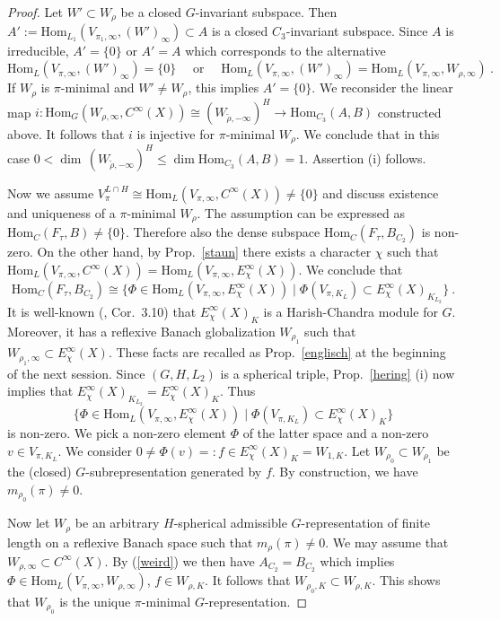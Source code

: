 \documentclass[10]{amsart}
\theoremstyle{remark}
\theoremstyle{definition}
\numberwithin{equation}{section}
\newcommand{\Hom}{\mathrm{Hom}}
\begin{document}
{\begin{proof}
Let $W'\subset W_\rho$ be a closed $G$-invariant subspace. Then $A':=\Hom_{L_1}(V_{\pi_1,\infty},(W')_{\infty})\subset A$ is a closed $C_3$-invariant subspace. Since $A$ is irreducible, 
$A'=\{0\}$ or $A'=A$ 
which corresponds to the alternative 
$$\Hom_{L}(V_{\pi,\infty},(W')_{\infty})=\{0\}\quad\mbox{ or }\quad\Hom_{L}(V_{\pi,\infty},(W')_{\infty})=\Hom_{L}(V_{\pi,\infty},W_{\rho,\infty})\ .$$
If $W_\rho$ is $\pi$-minimal and $W'\ne W_\rho$, this implies $A'=\{0\}$. 
We reconsider the linear map $i: \Hom_G(W_{\rho,\infty}, C^\infty(X))\cong (W_{\tilde\rho,-\infty})^H \rightarrow \Hom_{C_3}(A,B)$ constructed above.
It follows that $i$  is injective for $\pi$-minimal $W_\rho$.
We conclude that in this case $0<\dim\, (W_{\tilde\rho,-\infty})^H\le \dim   \Hom_{C_3}(A,B)=1$. Assertion (i) follows. 




Now we assume $V_\pi^{L\cap H}\cong  \Hom_{L}(V_{\pi,\infty},C^\infty(X))\ne\{0\}$ and discuss existence and uniqueness of a $\pi$-minimal  $W_\rho$. The assumption can
be expressed as $\Hom_C(F_\tau, B)\ne\{0\}$. Therefore also the dense subspace $\Hom_C(F_\tau, B_{C_2})$ is non-zero. On the other hand,
by Prop.~\ref{staun} there exists a character $\chi$ such that $ \Hom_{L}(V_{\pi,\infty},C^\infty(X))=\Hom_{L}(V_{\pi,\infty}, E_{\chi}^\infty(X))$. 
We conclude that 
$$\Hom_C(F_\tau, B_{C_2})\cong \{\Phi\in\Hom_{L}(V_{\pi,\infty}, E_{\chi}^\infty(X))\mid \Phi(V_{\pi,K_L})\subset E_{\chi}^\infty(X)_{K_{L_2}}\}\ .$$
It is well-known (\cite{Ban87}, Cor.~3.10) that  $E_{\chi}^\infty(X)_K$
is a Harish-Chandra module for $G$. Moreover, it has a reflexive Banach globalization $W_{\rho_1}$ such that $W_{\rho_1,\infty}\subset  E_{\chi}^\infty(X)$. These facts are recalled as Prop.~\ref{englisch}
at the beginning of the next session. Since $(G,H,L_2)$ is a spherical triple, Prop.~\ref{hering} (i) now implies that $E_{\chi}^\infty(X)_{K_{L_2}}=E_{\chi}^\infty(X)_K$.
Thus 
$$\{\Phi\in\Hom_{L}(V_{\pi,\infty}, E_{\chi}^\infty(X))\mid \Phi(V_{\pi,K_L})\subset E_{\chi}^\infty(X)_{K}\}$$
is non-zero. We pick a non-zero element $\Phi$ of the latter space and a non-zero $v\in V_{\pi,K_L}$. We consider $0\ne \Phi(v)=:f\in E_{\chi}^\infty(X)_K=W_{1,K}$.
Let $W_{\rho_0}\subset W_{\rho_1}$ be the (closed) $G$-subrepresentation generated by $f$. By construction, we have $m_{\rho_0}(\pi)\ne 0$.

Now let $W_\rho$ be an arbitrary $H$-spherical admissible $G$-representation of finite length on a reflexive Banach space such that $m_\rho(\pi)\ne 0$. We may assume that
$W_{\rho,\infty}\subset C^\infty(X)$. By (\ref{weird}) we then have $A_{C_2}= B_{C_2}$ which implies $\Phi\in\Hom_{L}(V_{\pi,\infty},W_{\rho,\infty})$, $f\in W_{\rho,K}$.
It follows that $W_{\rho_0,K}\subset  W_{\rho,K}$. This shows that $W_{\rho_0}$ is the unique $\pi$-minimal $G$-representation.
\end{proof}

}
\end{document}
